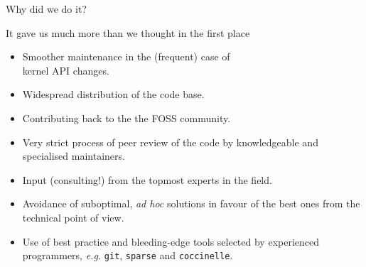 \documentclass[compress,red]{beamer}
\begin{document}
\begin{frame}{Why did we do it?}

It gave us much more than we thought in the first place
\begin{itemize}
\pause
\item Smoother maintenance in the (frequent) case of\\
	kernel API changes.
\item Widespread distribution of the code base.
\item Contributing back to the the FOSS community.
\pause \color{red}
\item Very strict process of peer review of the code by knowledgeable
    and specialised maintainers.
\pause
\item Input (consulting!) from the topmost experts in the field.
\pause
\item Avoidance of suboptimal, \emph{ad hoc} solutions in favour of the
    best ones from the technical point of view.
\pause
\item Use of best practice and bleeding-edge tools selected by
    experienced programmers, \emph{e.g.} \texttt{git}, \texttt{sparse}
    and \texttt{coccinelle}.
\end{itemize}
\end{frame}
\end{document}
